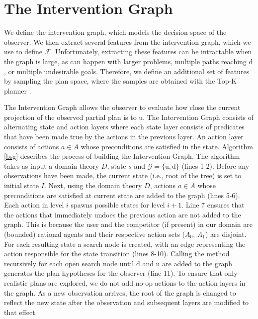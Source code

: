 \documentclass[letterpaper]{article}
\theoremstyle{plain}
\begin{document}
\section{The Intervention Graph}
\label{sec:stategraph}
We define the intervention graph, which models the decision space of the observer.
We then extract several features from the  intervention graph, which we use to define $\mathcal{F}$.
Unfortunately, extracting these features can be intractable when the graph is large, as can happen with larger problems, multiple paths reaching $\mathrm{d}$, or multiple undesirable goals. Therefore, we define an additional set of features by sampling the plan space, where the samples are obtained with the Top-K planner \cite{riabov2014}.

The Intervention Graph allows the observer to evaluate how close the current projection of the observed partial plan is to $\mathrm{u}$. The Intervention Graph consists of alternating state and action layers where each state layer consists of predicates that have been made true by the actions in the previous layer. An action layer consists of actions $a\in A$ whose preconditions are satisfied in the state. Algorithm \ref{bsg} describes the process of building the Intervention Graph. The algorithm takes as input a domain theory $D$, state $s$ and $\mathcal{G}=\lbrace\mathrm{u},\mathrm{d}\rbrace$ (lines 1-2). Before any observations have been made, the current state (i.e., root of the tree) is set to initial state $I$. Next, using the domain theory $D$, actions  $a\in A$ whose preconditions are satisfied at current state are added to the graph (lines 5-6). Each action in level $i$ spawns possible states for level $i+1$. Line 7 ensures that the actions that immediately undoes the previous action are not added to the graph. This is because the user and the competitor (if present) in our domain are (bounded) rational agents and their respective action sets ($A_0$, $A_1$) are disjoint. For each resulting state a search node is created, with an edge representing the action responsible for the state transition (lines 8-10). Calling the method recursively for each open search node until $\mathrm{d}$ and $\mathrm{u}$ are added to the graph generates the plan hypotheses for the observer (line 11). To ensure that only realistic plans are explored, we do not add no-op actions to the action layers in the graph. As a new observation arrives, the root of the graph is changed to reflect the new state after the observation and subsequent layers are  modified to that effect.  
\end{document}
